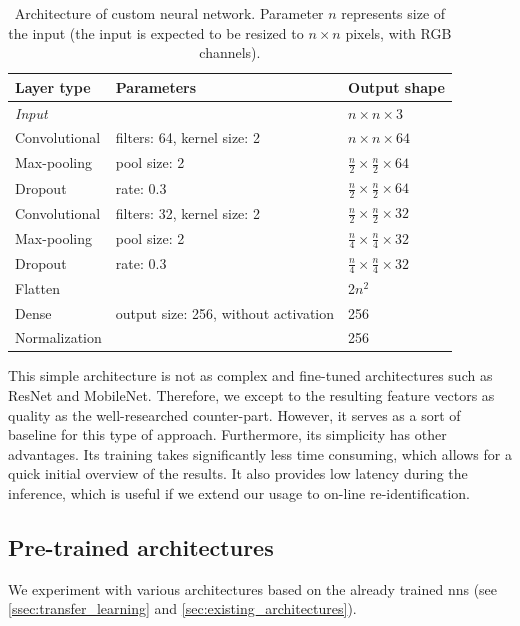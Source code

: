 \begin{table}
    \centering
    \begin{tabular}{l|l|l}
         Layer type & Parameters & Output shape \\ \hline
         \emph{Input} & & $n \times n \times 3$ \\
         Convolutional & filters: 64, kernel size: 2 & $n \times n \times 64$ \\
         Max-pooling & pool size: 2 & $\frac{n}{2} \times \frac{n}{2} \times 64$ \\
         Dropout & rate: 0.3 & $\frac{n}{2} \times \frac{n}{2} \times 64$ \\
         Convolutional & filters: 32, kernel size: 2 & $\frac{n}{2} \times \frac{n}{2} \times 32$ \\
         Max-pooling & pool size: 2 & $\frac{n}{4} \times \frac{n}{4} \times 32$ \\
         Dropout & rate: 0.3 & $\frac{n}{4} \times \frac{n}{4} \times 32$ \\
         Flatten & & 2$n^2$ \\
         Dense & output size: 256, without activation & 256 \\
         Normalization & & 256
    \end{tabular}
    \caption[Architecture of custom neural network]{Architecture of custom neural network. Parameter $n$ represents size of the input (the input is expected to be resized to $n\times n$ pixels, with RGB channels).}
    \label{tab:custom_architecture}
\end{table}

This simple architecture is not as complex and fine-tuned architectures such as ResNet and MobileNet. Therefore, we except to the resulting feature vectors as quality as the well-researched counter-part. However, it serves as a sort of baseline for this type of approach. Furthermore, its simplicity has other advantages. Its training takes significantly less time consuming, which allows for a quick initial overview of the results. It also provides low latency during the inference, which is useful if we extend our usage to on-line re-identification.

\subsection{Pre-trained architectures}

We experiment with various architectures based on the already trained \glspl{nn} (see \autoref{ssec:transfer_learning} and \autoref{sec:existing_architectures}).

